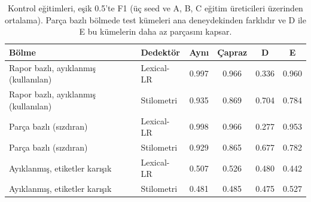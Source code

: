 \begin{table}[t]
\centering
\scriptsize\setlength{\tabcolsep}{3pt}
\caption{Kontrol eğitimleri, eşik 0.5'te F1 (üç seed ve A, B, C eğitim üreticileri üzerinden ortalama). Parça bazlı bölmede test kümeleri ana deneydekinden farklıdır ve D ile E bu kümelerin daha az parçasını kapsar.}
\label{tab:controls}
\begin{tabular}{llcccc}
\toprule
Bölme & Dedektör & Aynı & Çapraz & D & E \\
\midrule
Rapor bazlı, ayıklanmış (kullanılan) & Lexical-LR & 0.997 & 0.966 & 0.336 & 0.960 \\
Rapor bazlı, ayıklanmış (kullanılan) & Stilometri & 0.935 & 0.869 & 0.704 & 0.784 \\
Parça bazlı (sızdıran) & Lexical-LR & 0.998 & 0.966 & 0.277 & 0.953 \\
Parça bazlı (sızdıran) & Stilometri & 0.929 & 0.865 & 0.677 & 0.782 \\
Ayıklanmış, etiketler karışık & Lexical-LR & 0.507 & 0.526 & 0.480 & 0.442 \\
Ayıklanmış, etiketler karışık & Stilometri & 0.481 & 0.485 & 0.475 & 0.527 \\
\bottomrule
\end{tabular}
\end{table}

